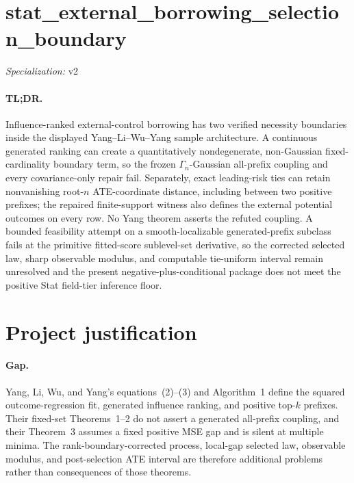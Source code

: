 \documentclass{article}
\begin{document}
\sloppy

\section*{stat\_\allowbreak{}external\_\allowbreak{}borrowing\_\allowbreak{}selection\_\allowbreak{}boundary}

\noindent\textit{Specialization:} v2\par

\paragraph{TL;DR.} Influence-ranked external-control borrowing has two verified necessity boundaries inside the displayed Yang--Li--Wu--Yang sample architecture.  A continuous generated ranking can create a quantitatively nondegenerate, non-Gaussian fixed-cardinality boundary term, so the frozen \(\Gamma_n\)-Gaussian all-prefix coupling and every covariance-only repair fail.  Separately, exact leading-risk ties can retain nonvanishing root-\(n\) ATE-coordinate distance, including between two positive prefixes; the repaired finite-support witness also defines the external potential outcomes on every row.  No Yang theorem asserts the refuted coupling.  A bounded feasibility attempt on a smooth-localizable generated-prefix subclass fails at the primitive fitted-score sublevel-set derivative, so the corrected selected law, sharp observable modulus, and computable tie-uniform interval remain unresolved and the present negative-plus-conditional package does not meet the positive Stat field-tier inference floor.

\section{Project justification}

\paragraph{Gap.} Yang, Li, Wu, and Yang's equations~(2)--(3) and Algorithm~1 define the squared outcome-regression fit, generated influence ranking, and positive top-\(k\) prefixes.  Their fixed-set Theorems~1--2 do not assert a generated all-prefix coupling, and their Theorem~3 assumes a fixed positive MSE gap and is silent at multiple minima.  The rank-boundary-corrected process, local-gap selected law, observable modulus, and post-selection ATE interval are therefore additional problems rather than consequences of those theorems.
\end{document}
